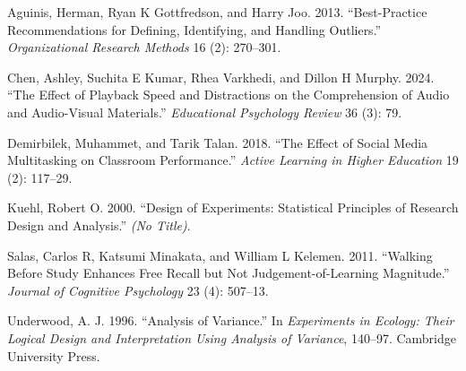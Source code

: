\documentclass[
  letterpaper,
]{book}
\newlength{\cslhangindent}
\newenvironment{CSLReferences}[2] %
 {\begin{list}{}{%
  \setlength{\itemindent}{0pt}
  \setlength{\leftmargin}{0pt}
  \setlength{\parsep}{0pt}
  \ifodd #1
   \setlength{\leftmargin}{\cslhangindent}
   \setlength{\itemindent}{-1\cslhangindent}
  \fi
  \setlength{\itemsep}{#2\baselineskip}}}
 {\end{list}}
\begin{document}
\label{refs}
\begin{CSLReferences}{1}{0}
Aguinis, Herman, Ryan K Gottfredson, and Harry Joo. 2013.
{``Best-Practice Recommendations for Defining, Identifying, and Handling
Outliers.''} \emph{Organizational Research Methods} 16 (2): 270--301.

Chen, Ashley, Suchita E Kumar, Rhea Varkhedi, and Dillon H Murphy. 2024.
{``The Effect of Playback Speed and Distractions on the Comprehension of
Audio and Audio-Visual Materials.''} \emph{Educational Psychology
Review} 36 (3): 79.

Demirbilek, Muhammet, and Tarik Talan. 2018. {``The Effect of Social
Media Multitasking on Classroom Performance.''} \emph{Active Learning in
Higher Education} 19 (2): 117--29.

Kuehl, Robert O. 2000. {``Design of Experiments: Statistical Principles
of Research Design and Analysis.''} \emph{(No Title)}.

Salas, Carlos R, Katsumi Minakata, and William L Kelemen. 2011.
{``Walking Before Study Enhances Free Recall but Not
Judgement-of-Learning Magnitude.''} \emph{Journal of Cognitive
Psychology} 23 (4): 507--13.

Underwood, A. J. 1996. {``Analysis of Variance.''} In \emph{Experiments
in Ecology: Their Logical Design and Interpretation Using Analysis of
Variance}, 140--97. Cambridge University Press.

\end{CSLReferences}


\backmatter
\end{document}
